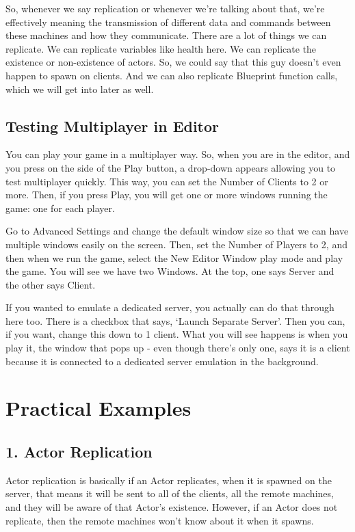 \documentclass[
  letterpaper,
  DIV=11,
  numbers=noendperiod]{scrartcl}
\begin{document}
So, whenever we say replication or whenever we're talking about that,
we're effectively meaning the transmission of different data and
commands between these machines and how they communicate. There are a
lot of things we can replicate. We can replicate variables like health
here. We can replicate the existence or non-existence of actors. So, we
could say that this guy doesn't even happen to spawn on clients. And we
can also replicate Blueprint function calls, which we will get into
later as well.

\subsection{Testing Multiplayer in
Editor}\label{testing-multiplayer-in-editor}

You can play your game in a multiplayer way. So, when you are in the
editor, and you press on the side of the Play button, a drop-down
appears allowing you to test multiplayer quickly. This way, you can set
the Number of Clients to 2 or more. Then, if you press Play, you will
get one or more windows running the game: one for each player.

Go to Advanced Settings and change the default window size so that we
can have multiple windows easily on the screen. Then, set the Number of
Players to 2, and then when we run the game, select the New Editor
Window play mode and play the game. You will see we have two Windows. At
the top, one says Server and the other says Client.

If you wanted to emulate a dedicated server, you actually can do that
through here too. There is a checkbox that says, `Launch Separate
Server'. Then you can, if you want, change this down to 1 client. What
you will see happens is when you play it, the window that pops up - even
though there's only one, says it is a client because it is connected to
a dedicated server emulation in the background.

\section{Practical Examples}\label{practical-examples}

\subsection{1. Actor Replication}\label{actor-replication-1}

Actor replication is basically if an Actor replicates, when it is
spawned on the server, that means it will be sent to all of the clients,
all the remote machines, and they will be aware of that Actor's
existence. However, if an Actor does not replicate, then the remote
machines won't know about it when it spawns.
\end{document}

